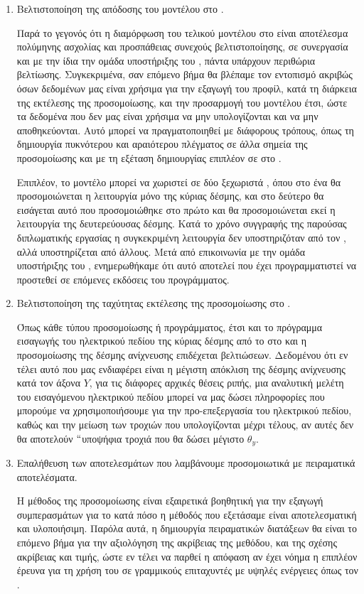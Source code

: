 \begin{enumerate}
\item Βελτιστοποίηση της απόδοσης του μοντέλου στο .

Παρά το γεγονός ότι η διαμόρφωση του τελικού μοντέλου στο  είναι αποτέλεσμα πολύμηνης ασχολίας και προσπάθειας συνεχούς βελτιστοποίησης, σε συνεργασία και με την ίδια την ομάδα υποστήριξης του , πάντα υπάρχουν περιθώρια βελτίωσης. 
Συγκεκριμένα, σαν επόμενο βήμα θα βλέπαμε τον εντοπισμό ακριβώς όσων δεδομένων μας είναι χρήσιμα για την εξαγωγή του προφίλ, κατά τη διάρκεια της εκτέλεσης της προσομοίωσης, και την προσαρμογή του μοντέλου έτσι, ώστε τα δεδομένα που δεν μας είναι χρήσιμα να μην υπολογίζονται και να μην αποθηκεύονται.
Αυτό μπορεί να πραγματοποιηθεί με διάφορους τρόπους, όπως τη δημιουργία πυκνότερου και αραιότερου πλέγματος σε άλλα σημεία της προσομοίωσης και με τη εξέταση δημιουργίας επιπλέον  σε  στο .

Επιπλέον, το μοντέλο μπορεί να χωριστεί σε δύο ξεχωριστά , όπου στο ένα θα προσομοιώνεται η λειτουργία μόνο της κύριας δέσμης, και στο δεύτερο θα εισάγεται αυτό που προσομοιώθηκε στο πρώτο και θα προσομοιώνεται εκεί η λειτουργία της δευτερεύουσας δέσμης.
Κατά το χρόνο συγγραφής της παρούσας διπλωματικής εργασίας η συγκεκριμένη λειτουργία δεν υποστηριζόταν από τον , αλλά υποστηρίζεται από άλλους.
Μετά από επικοινωνία με την ομάδα υποστήριξης του , ενημερωθήκαμε ότι αυτό αποτελεί  που έχει προγραμματιστεί να προστεθεί σε επόμενες εκδόσεις του προγράμματος.
\item Βελτιστοποίηση της ταχύτητας εκτέλεσης της προσομοίωσης στο .

Όπως κάθε τύπου προσομοίωσης ή προγράμματος, έτσι και το πρόγραμμα εισαγωγής του ηλεκτρικού πεδίου της κύριας δέσμης από το  στο  και η προσομοίωσης της δέσμης ανίχνευσης επιδέχεται βελτιώσεων.
Δεδομένου ότι εν τέλει αυτό που μας ενδιαφέρει είναι η μέγιστη απόκλιση της δέσμης ανίχνευσης κατά τον άξονα $Y$, για τις διάφορες αρχικές θέσεις ριπής, μια αναλυτική μελέτη του εισαγόμενου ηλεκτρικού πεδίου μπορεί να μας δώσει πληροφορίες που μπορούμε να χρησιμοποιήσουμε για την προ-επεξεργασία του ηλεκτρικού πεδίου, καθώς και την μείωση των τροχιών που υπολογίζονται μέχρι τέλους, αν αυτές δεν θα αποτελούν $``$υποψήφια τροχιά που θα δώσει μέγιστο $\theta_y$. 

\item Επαλήθευση των αποτελεσμάτων που λαμβάνουμε προσομοιωτικά με πειραματικά αποτελέσματα.

Η μέθοδος της προσομοίωσης είναι εξαιρετικά βοηθητική για την εξαγωγή συμπερασμάτων για το κατά πόσο η μέθοδός που εξετάσαμε είναι αποτελεσματική και υλοποιήσιμη.
Παρόλα αυτά, η δημιουργία πειραματικών διατάξεων θα είναι το επόμενο βήμα για την αξιολόγηση της ακρίβειας της μεθόδου, και της σχέσης ακρίβειας και τιμής, ώστε εν τέλει να παρθεί η απόφαση αν έχει νόημα η επιπλέον έρευνα για τη χρήση του  σε γραμμικούς επιταχυντές με υψηλές ενέργειες όπως τον .
\end{enumerate}